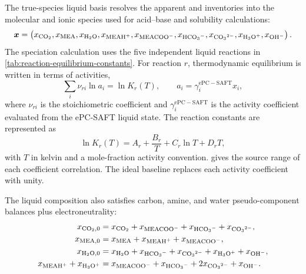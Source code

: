 The true-species liquid basis resolves the apparent \MEA and \COtwo inventories into the molecular and ionic species used for acid--base and solubility calculations:
\begin{equation}
    \boldsymbol{x}
    =
    \left(
    x_{\COtwo},x_{\MEA},x_{\HtwoO},x_{\MEAH},x_{\MEACOO},
    x_{\HCOthree},x_{\COthree},x_{\HthreeO},x_{\Hydroxide}
    \right).
    \label{eq:true-species-vector}
\end{equation}
The speciation calculation uses the five independent liquid reactions in \cref{tab:reaction-equilibrium-constants}.  For reaction \(r\), thermodynamic equilibrium is written in terms of activities,
\begin{equation}
    \sum_i \nu_{ri}\ln a_i = \ln K_r(T),
    \qquad
    a_i = \gamma_i^{\mathrm{ePC-SAFT}} x_i,
    \label{eq:activity-reaction-equilibrium}
\end{equation}
where $\nu_{ri}$ is the stoichiometric coefficient and $\gamma_i^{\mathrm{ePC-SAFT}}$ is the activity coefficient evaluated from the ePC-SAFT liquid state.  The reaction constants are represented as
\begin{equation}
    \ln K_r(T)=A_r+\frac{B_r}{T}+C_r\ln T+D_rT,
    \label{eq:reaction-equilibrium-constant-temperature}
\end{equation}
with \(T\) in kelvin and a mole-fraction activity convention.   gives the source range of each coefficient correlation.  The ideal baseline replaces each activity coefficient with unity.



The liquid composition also satisfies carbon, amine, and water pseudo-component balances plus electroneutrality:
\begin{align}
    x_{\COtwo,0} &= x_{\COtwo}+x_{\MEACOO}+x_{\HCOthree}+x_{\COthree}, \\
    x_{\MEA,0} &= x_{\MEA}+x_{\MEAH}+x_{\MEACOO}, \\
    x_{\HtwoO,0} &= x_{\HtwoO}+x_{\HCOthree}+x_{\COthree}+x_{\HthreeO}+x_{\Hydroxide}, \\
    x_{\MEAH}+x_{\HthreeO} &= x_{\MEACOO}+x_{\HCOthree}+2x_{\COthree}+x_{\Hydroxide}.
    \label{eq:true-species-balances}
\end{align}

